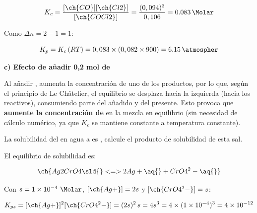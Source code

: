 \begin{exerciseEVAU}
\begin{solu}
        \begin{equation*}
            K_c = \dfrac{[\ch{CO}][\ch{Cl2}]}{[\ch{COCl2}]} = \dfrac{(0,094)^2}{0,106} = \SI{0.083}{\Molar}
        \end{equation*}

        Como \(\Delta n = 2 - 1 = 1\):

        \begin{equation*}
            K_p = K_c\, (RT) = 0,083 \times (0,082 \times 900) = \SI{6.15}{\atmospher}
        \end{equation*}

        \textbf{c) Efecto de añadir 0,2 mol de }

        Al añadir , aumenta la concentración de uno de los productos, por lo que, según el principio de Le Châtelier, el equilibrio se desplaza hacia la izquierda (hacia los reactivos), consumiendo parte del  añadido y del  presente. Esto provoca que \textbf{aumente la concentración de } en la mezcla en equilibrio (sin necesidad de cálculo numérico, ya que \(K_c\) se mantiene constante a temperatura constante).

    \end{solu}

\end{exerciseEVAU}

\begin{exerciseEVAU}

    La solubilidad del  en agua a  es , calcule el producto de solubilidad de esta sal.


    \begin{solu}

        El equilibrio de solubilidad es:

        \begin{equation*}
            \ch{Ag2CrO4 \sld{} <=> 2 Ag+ \aq{} + CrO4^2- \aq{}}
        \end{equation*}

        Con \(s = \num{1e-4}\ \si{\Molar}\), \([\ch{Ag+}] = 2s\) y \([\ch{CrO4^2-}] = s\):

        \begin{equation*}
            K_{ps} = [\ch{Ag+}]^2[\ch{CrO4^2-}] = (2s)^2\, s = 4 s^3 = 4 \times (1 \times 10^{-4})^3 = \num{4e-12}
        \end{equation*}

    \end{solu}

\end{exerciseEVAU}

